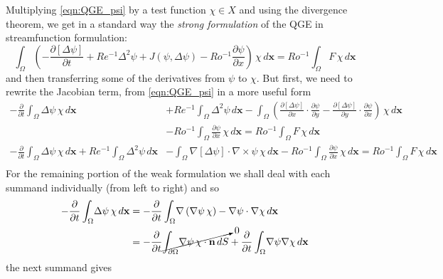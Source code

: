 Multiplying \eqref{eqn:QGE_psi} by a test function $\chi \in X$ and using the
divergence theorem, we get in a standard way the \emph{strong formulation} of
the QGE in streamfunction formulation:
\begin{equation*}
  \int_{\Omega}\! \left(-\frac{\partial \left[ \Delta \psi \right]}{\partial t} + Re^{-1}
    \Delta^2 \psi +  J(\psi,\Delta \psi) - Ro^{-1}\frac{\partial \psi}{\partial
    x}\right)\, \chi \, d\mathbf{x} = Ro^{-1} \int_{\Omega}\! F\, \chi \, d\mathbf{x}
\end{equation*}
and then transferring some of the derivatives from $\psi$ to $\chi$. But first,
we need to rewrite the Jacobian term, from \eqref{eqn:QGE_psi} in a more useful
form
\begin{align*}
  -\frac{\partial}{\partial t} \int_{\Omega}\! \Delta \psi \, \chi \, d\mathbf{x}
    &+ Re^{-1} \int_{\Omega}\! \Delta^2 \psi \, d\mathbf{x}
    - \int_{\Omega}\! \left(\frac{\partial\left[\Delta\psi \right]}{\partial x}\cdot \frac{\partial
      \psi}{\partial y} -
    \frac{\partial\left[ \Delta\psi \right]}{\partial y}\cdot
    \frac{\partial \psi}{\partial x}\right)\, \chi\, d\mathbf{x} \\
    &- Ro^{-1} \int_{\Omega}\! \frac{\partial \psi}{\partial x}\, \chi \, d\mathbf{x}
    = Ro^{-1} \int_{\Omega}\! F\, \chi \, d\mathbf{x} \\
  -\frac{\partial}{\partial t} \int_{\Omega}\! \Delta \psi \, \chi \, d\mathbf{x}
    + Re^{-1} \int_{\Omega}\! \Delta^2 \psi \, d\mathbf{x}
    & - \int_{\Omega}\! \nabla \left[\Delta\psi\right]\cdot \nabla \times \psi \, \chi\,
      d\mathbf{x}
    -Ro^{-1} \int_{\Omega}\! \frac{\partial \psi}{\partial x}\, \chi \, d\mathbf{x}
    = Ro^{-1} \int_{\Omega}\! F\, \chi \, d\mathbf{x} \\
\end{align*}
For the remaining portion of the weak formulation we shall deal with each
summand individually (from left to right) and so
\begin{align*}
  -\frac{\partial}{\partial t} \int_{\Omega}\! \Delta \psi\, \chi \, d\mathbf{x} &=
    -\frac{\partial}{\partial t} \int_{\Omega}\! \nabla \left( \nabla \psi \, \chi \right) -
    \nabla \psi \cdot \nabla \chi \, d\mathbf{x} \\
  &= -\frac{\partial}{\partial t} \cancelto{0}{\int_{\partial \Omega}\! \nabla \psi \, \chi
    \cdot \mathbf{n} \, dS} + \frac{\partial}{\partial t} \int_{\Omega}\! \nabla \psi \nabla \chi
    \, d\mathbf{x}
\end{align*}
the next summand gives
